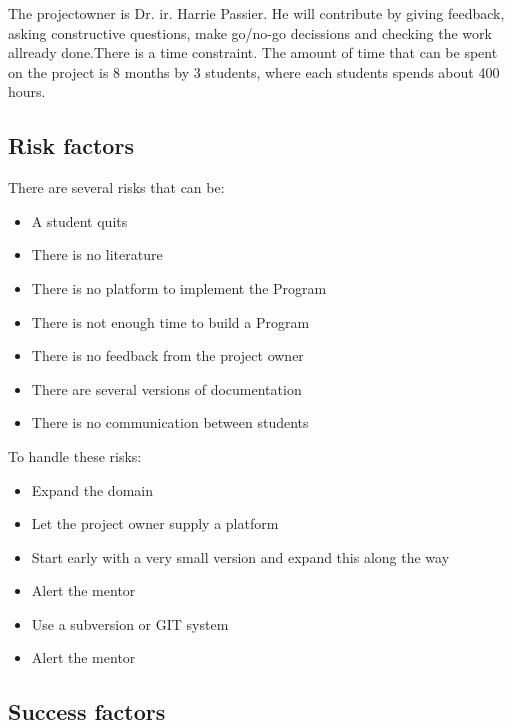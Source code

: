 \documentclass{article}
\begin{document}
The projectowner is Dr. ir. Harrie Passier. He will contribute by giving feedback, asking constructive questions, make go/no-go decissions and checking the work allready done.There is a time constraint. The amount of time that can be spent on the project is 8 months by 3 students, where each students spends about 400 hours. 

\subsection{Risk factors}

There are several risks that can be:
\begin{itemize}
  \item A student quits
  \item There is no literature
  \item There is no platform to implement the Program
  \item There is not enough time to build a Program
  \item There is no feedback from the project owner
  \item There are several versions of documentation
  \item There is no communication between students
\end{itemize}

\noindent To handle these risks:
\begin{itemize}
  \item Expand the domain
  \item Let the project owner supply a platform
  \item Start early with a very small version and expand this along the way
  \item Alert the mentor
  \item Use a subversion or GIT system
  \item Alert the mentor
\end{itemize}

\subsection{Success factors}
\end{document}
